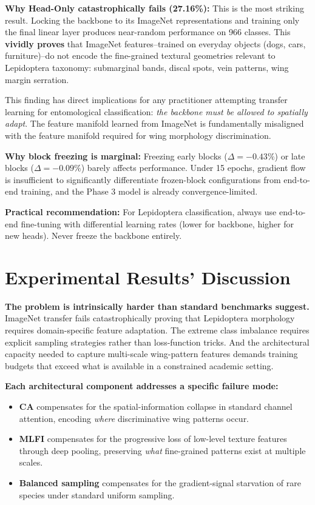 \documentclass[10pt, twocolumn]{article}
\begin{document}
\textbf{Why Head-Only catastrophically fails (27.16\%):}
This is the most striking result. Locking the backbone to its ImageNet representations and training only the final linear layer produces near-random performance on 966 classes. This \textbf{vividly proves} that ImageNet features--trained on everyday objects (dogs, cars, furniture)--do not encode the fine-grained textural geometries relevant to Lepidoptera taxonomy: submarginal bands, discal spots, vein patterns, wing margin serration.

This finding has direct implications for any practitioner attempting transfer learning for entomological classification: \emph{the backbone must be allowed to spatially adapt}. The feature manifold learned from ImageNet is fundamentally misaligned with the feature manifold required for wing morphology discrimination.

\textbf{Why block freezing is marginal:}
Freezing early blocks ($\Delta = -0.43\%$) or late blocks ($\Delta = -0.09\%$) barely affects performance. Under 15 epochs, gradient flow is insufficient to significantly differentiate frozen-block configurations from end-to-end training, and the Phase 3 model is already convergence-limited.

\textbf{Practical recommendation:} For Lepidoptera classification, always use end-to-end fine-tuning with differential learning rates (lower for backbone, higher for new heads). Never freeze the backbone entirely.

\section{Experimental Results' Discussion}
\label{sec:discussion}

\textbf{The problem is intrinsically harder than standard benchmarks suggest.} ImageNet transfer fails catastrophically proving that Lepidoptera morphology requires domain-specific feature adaptation. The extreme class imbalance requires explicit sampling strategies rather than loss-function tricks. And the architectural capacity needed to capture multi-scale wing-pattern features demands training budgets that exceed what is available in a constrained academic setting.

\textbf{Each architectural component addresses a specific failure mode:}
\begin{itemize}[leftmargin=*, topsep=2pt, itemsep=1pt]
    \item \textbf{CA} compensates for the spatial-information collapse in standard channel attention, encoding \emph{where} discriminative wing patterns occur.
    \item \textbf{MLFI} compensates for the progressive loss of low-level texture features through deep pooling, preserving \emph{what} fine-grained patterns exist at multiple scales.
    \item \textbf{Balanced sampling} compensates for the gradient-signal starvation of rare species under standard uniform sampling.
\end{itemize}
\end{document}

